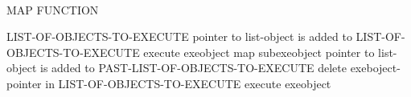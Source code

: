 \documentclass[15pt,a4paper,oneside]{article}
\begin{document}
\ \\
MAP FUNCTION\vspace{-2em}\\
\begin{algorithm}[H]\begin{algorithmic}
\STATE LIST-OF-OBJECTS-TO-EXECUTE
\STATE pointer to list-object is added to LIST-OF-OBJECTS-TO-EXECUTE 
\ENDIF
\ENDFOR
\ENDFOR
{}
\STATE execute exeobject
\STATE map subexeobject
\ENDFOR
\ENDIF
\STATE pointer to list-object is added to PAST-LIST-OF-OBJECTS-TO-EXECUTE 
\STATE delete exeboject-pointer in LIST-OF-OBJECTS-TO-EXECUTE 
\ENDFOR
{}
\STATE execute exeobject
\ENDFOR
\end{algorithmic}\end{algorithm}
\end{document}
